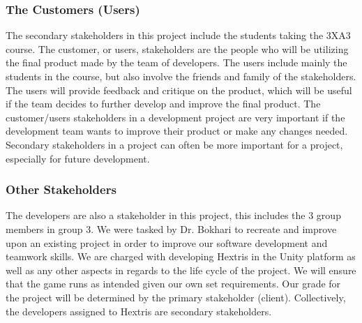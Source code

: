 \documentclass[12pt, titlepage]{article}
\begin{document}
\subsubsection{The Customers (Users)}
The secondary stakeholders in this project include the students taking the 3XA3 course. The customer, or users, stakeholders are the people who will be utilizing the final product made by the team of developers. The users include mainly the students in the course, but also involve the friends and family of the stakeholders. The users will provide feedback and critique on the product, which will be useful if the team decides to further develop and improve the final product. The customer/users stakeholders in a development project are very important if the development team wants to improve their product or make any changes needed. Secondary stakeholders in a project can often be more important for a project, especially for future development.

\subsubsection{Other Stakeholders}
The developers are also a stakeholder in this project, this includes the 3 group members in group 3. We were tasked by Dr. Bokhari to recreate and improve upon an existing project in order to improve our software development and teamwork skills. We are charged with developing Hextris in the Unity platform as well as any other aspects in regards to the life cycle of the project. We will ensure that the game runs as intended given our own set requirements. Our grade for the project will be determined by the primary stakeholder (client). Collectively, the developers assigned to Hextris are secondary stakeholders.
\end{document}
